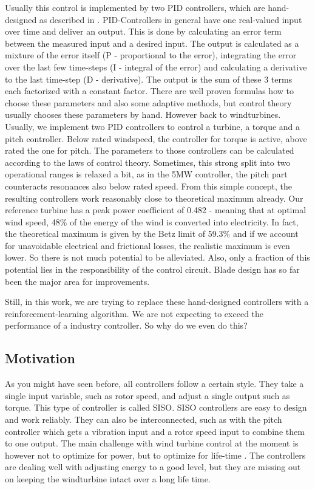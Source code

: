\documentclass[hyperref,final,beleg]{cgvpub}
\begin{document}
Usually this control is implemented by two PID controllers, which are hand-designed as described in \cite[sec 8.4]{burtonWindEnergyHandbook2011}. PID-Controllers in general have one real-valued input over time and deliver an output. This is done by calculating an error term between the measured input and a desired input. The output is calculated as a mixture of the error itself (P - proportional to the error), integrating the error over the last few time-steps (I - integral of the error) and calculating a derivative to the last time-step (D - derivative). The output is the sum of these 3 terms each factorized with a constant factor. There are well proven formulas how to choose these parameters and also some adaptive methods, but control theory usually chooses these parameters by hand.
However back to windturbines. Usually, we implement two PID controllers to control a turbine, a torque and a pitch controller. Below rated windspeed, the controller for torque is active, above rated the one for pitch. The parameters to those controllers can be calculated according to the laws of control theory. Sometimes, this strong split into two operational ranges is relaxed a bit, as in the 5MW controller, the pitch part counteracts resonances also below rated speed. From this simple concept, the resulting controllers work reasonably close to theoretical maximum already. Our reference turbine has a peak power coefficient of 0.482 - meaning that at optimal wind speed, 48\% of the energy of the wind is converted into electricity. In fact, the theoretical maximum is given by the Betz limit of 59.3\% and if we account for unavoidable electrical and frictional losses, the realistic maximum is even lower. So there is not much potential to be alleviated. Also, only a fraction of this potential lies in the responsibility of the control circuit. Blade design has so far been the major area for improvements.

Still, in this work, we are trying to replace these hand-designed controllers with a reinforcement-learning algorithm. We are not expecting to exceed the performance of a industry controller. So why do we even do this?

\subsection{Motivation}

As you might have seen before, all controllers follow a certain style. They take a single input variable, such as rotor speed, and adjust a single output such as torque. This type of controller is called \ac{SISO}. \ac{SISO} controllers are easy to design and work reliably. They can also be interconnected, such as with the pitch controller which gets a vibration input and a rotor speed input to combine them to one output. The main challenge with wind turbine control at the moment is however not to optimize for power, but to optimize for life-time \cite[Chapter 4]{vankuikLongtermResearchChallenges2016}. The controllers are dealing well with adjusting energy to a good level, but they are missing out on keeping the windturbine intact over a long life time.
\end{document}
